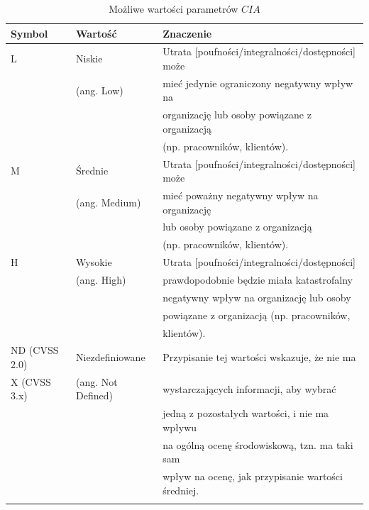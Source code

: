\begin{table}[tbh]
\caption{Możliwe wartości parametrów $CIA$}
\begin{center}
\label{tab:chapter2:cia}
\begin{tabular}{lll}
\hline \noalign {\smallskip}
\textbf{Symbol} & \textbf{Wartość} & \textbf{Znaczenie}    \\
\hline \noalign {\smallskip}
L   &   Niskie     & Utrata [poufności/integralności/dostępności] może \\
    &   (ang. Low) & mieć jedynie ograniczony negatywny wpływ na  \\
    &              & organizację lub osoby powiązane z organizacją  \\
    &              & (np. pracowników, klientów).\\
\hline \noalign {\smallskip}
M   & Średnie      & Utrata [poufności/integralności/dostępności] może \\
    & (ang. Medium)& mieć poważny negatywny wpływ na organizację \\
    &              & lub osoby powiązane z organizacją  \\
    &              & (np. pracowników, klientów).\\
\hline \noalign {\smallskip}
H   &  Wysokie     & Utrata [poufności/integralności/dostępności]  \\
    &  (ang. High) & prawdopodobnie będzie miała katastrofalny \\
    &              & negatywny wpływ na organizację lub osoby   \\
    &              & powiązane z organizacją (np. pracowników,  \\
    &              & klientów). \\
\hline \noalign {\smallskip}
ND (CVSS 2.0)& Niezdefiniowane   & Przypisanie tej wartości wskazuje, że nie ma  \\ 
X (CVSS 3.x) & (ang. Not Defined)& wystarczających informacji, aby wybrać \\
                  &                 & jedną z pozostałych wartości, i nie ma wpływu \\ 
                  &                 & na ogólną ocenę środowiskową, tzn. ma taki sam \\
                  &                 & wpływ na ocenę, jak przypisanie wartości średniej. \\
\hline \noalign {\smallskip}
\end{tabular}
\end{center}
\end{table}

